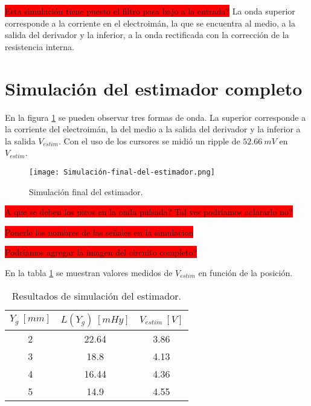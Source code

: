 \colorbox{red}{Esta simulación tiene puesto el filtro pasa bajo a la entrada?}
La onda superior corresponde a la corriente en el electroimán, la que se encuentra al medio, a la salida del derivador y la inferior, a la onda rectificada con la corrección de la resistencia interna.


\section{Simulación del estimador completo}

En la figura \ref{fig:img_Simulación_final_del_estimado} se pueden observar tres formas de onda. La superior corresponde a la corriente del electroimán, la del medio a la salida del derivador y la inferior a la salida $V_{estim}$. Con el uso de los cursores se midió un ripple de $52.66\:mV $ en $V_{estim}$.

\begin{figure}[H]
	\centering
	\texttt{[image: Simulación-final-del-estimador.png]}
	\caption{Simulación final del estimador.}
	\label{fig:img_Simulación_final_del_estimado}
\end{figure}

\colorbox{red}{A que se deben los picos en la onda pulsada? Tal ves podríamos aclararlo no?}


\colorbox{red}{Ponerle los nombres de las señales en la simulacion}


\colorbox{red}{Podríamos agregar la imagen del circuito completo?}



En la tabla \ref{tab_Resultados_de_simulación_del_estimador} se muestran valores medidos de $V_{estim}$ en función de la posición.


\begin{table}[H]
	\begin{center}
		\begin{tabular}{| c | c | c |}
			\hline
			$Y_g\:[mm]$ & $L(Y_g)\:[mHy]$ & $V_{estim}\:[V]$ \\ \hline 
			2 & 22.64 & 3.86 \\ \hline 
			3 & 18.8 & 4.13 \\ \hline 
			4 & 16.44 & 4.36 \\ \hline 
			5 & 14.9 & 4.55 \\ \hline 
		\end{tabular}
		\caption{Resultados de simulación del estimador.}
		\label{tab_Resultados_de_simulación_del_estimador}
	\end{center}
\end{table}

